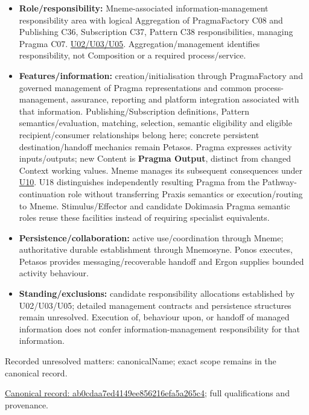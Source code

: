 \begin{itemize}


\item \textbf{Role/responsibility:} Mneme-associated information-management responsibility
  area with logical Aggregation of PragmaFactory C08 and Publishing C36,
  Subscription C37, Pattern C38 responsibilities, managing Pragma C07.
  \href{\detokenize{../../../../../../../../../docs/markdown/05-information-systems-architecture/sources.md#u05}}{U02/U03/U05}. Aggregation/management identifies responsibility,
  not Composition or a required process/service.

\item \textbf{Features/information:} creation/initialisation through PragmaFactory and
  governed management of Pragma representations and common process-management,
  assurance, reporting and platform integration associated with that information.
  Publishing/Subscription definitions, Pattern semantics/evaluation, matching,
  selection, semantic eligibility and eligible recipient/consumer relationships
  belong here; concrete persistent destination/handoff mechanics remain Petasos.
  Pragma expresses activity inputs/outputs; new Content is \textbf{Pragma Output}, distinct
  from changed Context working values. Mneme manages its subsequent consequences
  under \hyperref[element:27ad143e7c784e378556af8a57c438f7]{U10}.
  U18 distinguishes independently resulting Pragma from the Pathway-continuation
  role without transferring Praxis semantics or execution/routing to Mneme.
  Stimulus/Effector and candidate Dokimasia Pragma semantic roles
  reuse these facilities instead of requiring specialist equivalents.

\item \textbf{Persistence/collaboration:} active use/coordination through Mneme; authoritative
  durable establishment through Mnemosyne. Ponos executes, Petasos provides
  messaging/recoverable handoff and Ergon supplies bounded activity behaviour.

\item \textbf{Standing/exclusions:} candidate responsibility allocations established by
  U02/U03/U05;
  detailed management contracts and persistence structures remain unresolved.
  Execution of, behaviour upon, or handoff of managed information does not
  confer information-management responsibility for that information.

\end{itemize}

{\small Recorded unresolved matters: canonicalName; exact scope remains in the canonical record.}\par
{\footnotesize \href{../../../../../../../../continuum/application/application-function/ab0cdaa7ed4149ee856216efa5a265c4.md}{Canonical record: ab0cdaa7ed4149ee856216efa5a265c4}; full qualifications and provenance.}\par

